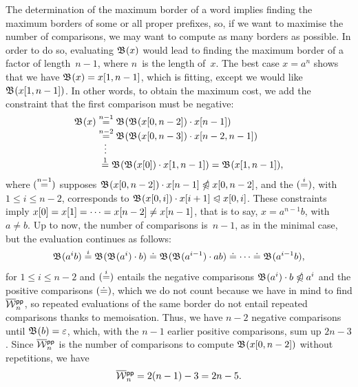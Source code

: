 The determination of the maximum border of a word implies finding the
maximum borders of some or all proper prefixes, so, if we want to
maximise the number of comparisons, we may want to compute as many
borders as possible. In order to do so, evaluating \(\mathfrak{B}^{}(x)\)
would lead to finding the maximum border of a factor of
length~\(n-1\), where \(n\)~is the length of~\(x\). The best case
\(x=a^{n}\) shows that we have \(\mathfrak{B}^{}(x) = {x}[{1,n-1}]\),
which is fitting, except we would like
\(\mathfrak{B}^{}({x}[{1,n-1}])\). In other words, to obtain the maximum
cost, we add the constraint that the first comparison must be
negative:
\begin{align*}
\mathfrak{B}^{}(x)
&\mathrel{\stackrel{\smash{n-1}}{=}} \mathfrak{B}^{}(\mathfrak{B}^{}({x}[{0,n-2}]) \cdot {x}[{n-1}])\\
&\mathrel{\stackrel{\smash{n-2}}{=}} \mathfrak{B}^{}(\mathfrak{B}^{}({x}[{0,n-3}]) \cdot {x}[{n-2,n-1}])\\
&\;\;\;\smash{\vdots}\\
&\;\mathrel{\stackrel{\smash[t]{1}}{=}}
  \mathfrak{B}^{}(\mathfrak{B}^{}({x}[{0}]) \cdot {x}[{1,n-1}])
= \mathfrak{B}^{}({x}[{1,n-1}]),
\end{align*}
where \((\smash{\mathrel{\stackrel{\smash{n-1}}{=}}})\) supposes \(\mathfrak{B}^{}({x}[{0,n-2}])
\cdot {x}[{n-1}] \mathrel{\ntrianglelefteqslant} {x}[{0,n-2}]\), and the
\((\smash{\mathrel{\stackrel{\smash{i}}{=}}})\), with \(1 \leqslant i \leqslant n-2\),
corresponds to \(\mathfrak{B}^{}({x}[{0,i}]) \cdot {x}[{i+1}] \mathrel{\trianglelefteqslant}
{x}[{0,i}]\). These constraints imply \({x}[{0}] = {x}[{1}] =
\dots = {x}[{n-2}] \neq {x}[{n-1}]\), that is to say,
\(x=a^{n-1}b\), with \(a \neq b\). Up to now, the number of
comparisons is~\(n-1\), as in the minimal case, but the evaluation
continues as follows:
\begin{equation*}
\mathfrak{B}^{}(a^{i}b)
\mathrel{\stackrel{\smash{i}}{=}} \mathfrak{B}^{}(\mathfrak{B}^{}(a^{i}) \cdot b)\\
\doteq \mathfrak{B}^{}(\mathfrak{B}^{}(a^{i-1}) \cdot ab)\\
\doteq \dots \doteq \mathfrak{B}^{}(a^{i-1}b),
\end{equation*}
for \(1 \leqslant i \leqslant n-2\) and \((\smash{\mathrel{\stackrel{\smash{i}}{=}}})\) entails
the negative comparisons \(\mathfrak{B}^{}(a^{i}) \cdot b \mathrel{\ntrianglelefteqslant} a^{i}\)
and the positive comparisons \((\smash{\doteq})\), which we do not
count because we have in mind to find
\(\OW{\fun{pp}}{n}\), so repeated
evaluations of the same border do not entail repeated comparisons
thanks to memoisation. Thus, we have \(n-2\)
negative comparisons until \(\mathfrak{B}^{}(b) = \varepsilon\), which, with
the \(n-1\) earlier positive comparisons, sum up \(2n-3\). Since
\(\OW{\fun{pp}}{n}\) is the number of comparisons to compute
\(\mathfrak{B}^{}({x}[{0,n-2}])\) without repetitions, we have
\begin{equation*}
\belowdisplayskip=0pt
\OW{\fun{pp}}{n} = 2(n-1)-3 = 2n - 5.
\end{equation*}

